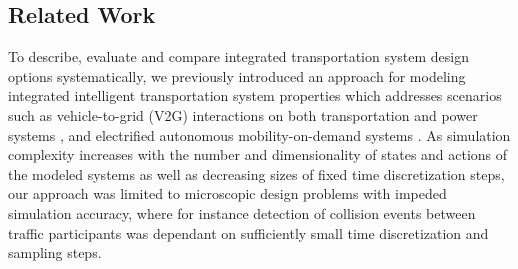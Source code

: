 \documentclass[graybox]{svmult}
\begin{document}
\subsection{Related Work}


To describe, evaluate and compare integrated transportation system design options systematically, we previously introduced an approach for modeling integrated intelligent transportation system properties which addresses scenarios such as vehicle-to-grid (V2G) interactions on both transportation and power systems \cite{Ascher2015}, \cite{Ascher2016} and electrified autonomous mobility-on-demand systems \cite{Ascher2017}. As simulation complexity increases with the number and dimensionality of states and actions of the modeled systems as well as decreasing sizes of fixed time discretization steps, our approach was limited to microscopic design problems with impeded simulation accuracy, where for instance detection of collision events between traffic participants was dependant on sufficiently small time discretization and sampling steps.
\end{document}
